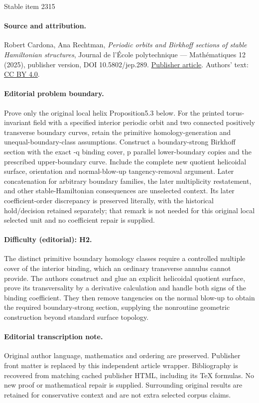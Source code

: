 \documentclass[11pt]{article}
\theoremstyle{definition}
\begin{document}
\begin{center}{\Large Stable item 2315}\end{center}
\paragraph{Source and attribution.}
Robert Cardona, Ana Rechtman, \emph{Periodic orbits and Birkhoff sections of stable Hamiltonian structures}, Journal de l’École polytechnique — Mathématiques 12 (2025), publisher version, DOI 10.5802/jep.289. \href{https://jep.centre-mersenne.org/articles/10.5802/jep.289/}{Publisher article}. Authors' text: \href{https://creativecommons.org/licenses/by/4.0/}{CC BY 4.0}.
\paragraph{Editorial problem boundary.}
Prove only the original local helix Proposition5.3 below. For the printed torus-invariant field with a specified interior periodic orbit and two connected positively transverse boundary curves, retain the primitive homology-generation and unequal-boundary-class assumptions. Construct a boundary-strong Birkhoff section with the exact -q binding cover, p parallel lower-boundary copies and the prescribed upper-boundary curve. Include the complete new quotient helicoidal surface, orientation and normal-blow-up tangency-removal argument. Later concatenation for arbitrary boundary families, the later multiplicity restatement, and other stable-Hamiltonian consequences are unselected context. Its later coefficient-order discrepancy is preserved literally, with the historical hold/decision retained separately; that remark is not needed for this original local selected unit and no coefficient repair is supplied.
\paragraph{Difficulty (editorial): H2.}
The distinct primitive boundary homology classes require a controlled multiple cover of the interior binding, which an ordinary transverse annulus cannot provide. The authors construct and glue an explicit helicoidal quotient surface, prove its transversality by a derivative calculation and handle both signs of the binding coefficient. They then remove tangencies on the normal blow-up to obtain the required boundary-strong section, supplying the nonroutine geometric construction beyond standard surface topology.
\paragraph{Editorial transcription note.}
Original author language, mathematics and ordering are preserved. Publisher front matter is replaced by this independent article wrapper. Bibliography is recovered from matching cached publisher HTML, including its TeX formulas. No new proof or mathematical repair is supplied. Surrounding original results are retained for conservative context and are not extra selected corpus claims.
\clearpage
\end{document}

